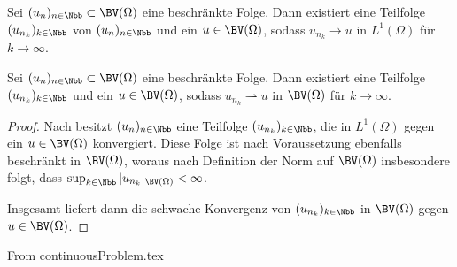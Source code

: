 \begin{theorem}
  \label{thm:l1ConvergentSubsequence}
  Sei $(u_n)_{n\in\Nbb}\subset \BV(\Omega)$ eine beschränkte Folge. Dann 
  existiert eine Teilfolge $(u_{n_k})_{k\in\Nbb}$ von
  $(u_n)_{n\in\Nbb}$ und ein $u\in\BV(\Omega)$, sodass
  $u_{n_k}\to u$ in $L^1(\Omega)$ für $k\to \infty$.
\end{theorem}

\begin{theorem}
  \label{thm:compactness}
  Sei $(u_n)_{n\in\Nbb}\subset \BV(\Omega)$ eine beschränkte Folge. Dann 
  existiert eine Teilfolge $(u_{n_k})_{k\in\Nbb}$ und ein $u\in\BV(\Omega)$,
  sodass $u_{n_k}\rightharpoonup u$ in $\BV(\Omega)$ für $k\rightarrow\infty$.
\end{theorem}

\begin{proof}
  Nach  besitzt $(u_n)_{n\in\Nbb}$ eine
  Teilfolge $(u_{n_k})_{k\in\Nbb}$, die in $L^1(\Omega)$ gegen ein
  $u\in\BV(\Omega)$ konvergiert.
  Diese Folge ist nach Voraussetzung ebenfalls beschränkt in 
  $\BV(\Omega)$, woraus nach Definition der Norm auf $\BV(\Omega)$ insbesondere
  folgt, dass
  $\sup_{k\in\Nbb}|u_{n_k}|_{\BV(\Omega)}< \infty$. 
  
  Insgesamt liefert  dann die schwache Konvergenz von
  $(u_{n_k})_{k\in\Nbb}$ in $\BV(\Omega)$ gegen $u\in\BV(\Omega)$.
\end{proof}

From continuousProblem.tex

